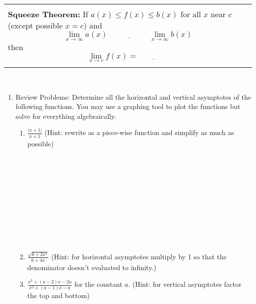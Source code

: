 \documentclass[12pt]{report}
\newenvironment{boxe}
    {\begin{center}
    \begin{tabular}{|p{0.9\textwidth}|}
    \hline\\
    }
    { 
    \\\\\hline
    \end{tabular} 
    \end{center}
    }
\begin{document}
\begin{boxe}  \textbf{Squeeze Theorem:} If $a(x)\leq f(x) \leq b(x)$ for all $x$ near $c$ (except possible $x=c$) and $$\lim_{x\to \infty}a(x)\;\underline{\;\;\;\;\;\;\;\;\;\;\;\;\;\;\;\;\;}\;\lim_{x\to \infty}b(x)$$
then
\[ \lim_{x\to c} f(x) = \underline{\;\;\;\;\;\;\;\;\;\;\;\;\;\;} \]
\end{boxe}
\;\\
\begin{enumerate}[resume]
\item Review Problems: Determine all the horizontal and vertical asymptotes of the following functions. You may use a graphing tool to plot the functions but solve for everything algebraically.\\
\begin{enumerate}[label=\alph*.]
    \item $\displaystyle{\frac{|x+1|}{x+1}}$ (Hint: rewrite as a piece-wise function and simplify as much as possible)\\\\\\\\\\\\\\\\\\\\\\
    \item $\displaystyle{\frac{\sqrt{6+2x^{2}}}{6+4x}}$ (Hint: for horizontal asymptotes multiply by 1 so that the denominator doesn't evaluated to infinity.)\newpage
    \item $\displaystyle{\frac{x^{2}+\left(a-2\right)x-2a}{x^2+(a-1)x-a}}$ for the constant $a$. (Hint: for vertical asymptotes factor the top and bottom)\\\\\\\\\\\\\\\\\\\\\\\\\\\\


    
\end{enumerate}


\end{enumerate}
\end{document}
